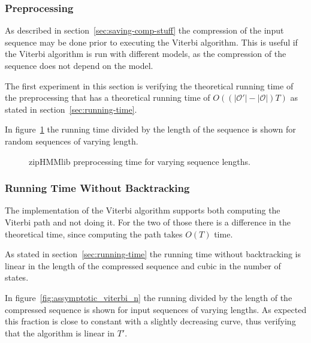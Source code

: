 \subsubsection{Preprocessing}
\label{sec:preprocessing}

As described in section~\ref{sec:saving-comp-stuff} the compression of the
input sequence may be done prior to executing the Viterbi algorithm. This is
useful if the Viterbi algorithm is run with different models, as the
compression of the sequence does not depend on the model.

The first experiment in this section is verifying the theoretical running time
of the preprocessing that has a theoretical running time of
$O( \left( \lvert\mathcal{O'}\rvert - \lvert{\mathcal{O}}\rvert \right) T)$ as
stated in section~\ref{sec:running-time}.

In figure~\ref{fig:pre_viterbi_n} the running time divided by the length of the
sequence is shown for random sequences of varying length. 

\begin{figure}
  \centering
  
  \caption{zipHMMlib preprocessing time for varying sequence lengths.}
  \label{fig:pre_viterbi_n}
\end{figure}

%   

\subsubsection{Running Time Without Backtracking}
\label{sec:running-time-without}

The implementation of the Viterbi algorithm supports both computing the Viterbi
path and not doing it. For the two of those there is a difference in the
theoretical time, since computing the path takes $O(T)$ time.

As stated in section~\ref{sec:running-time} the running time without
backtracking is linear in the length of the compressed sequence and cubic in
the number of states.

In figure~\ref{fig:assymptotic_viterbi_n} the running divided by the length of
the compressed sequence is shown for input sequences of varying lengths. As
expected this fraction is close to constant with a slightly decreasing curve,
thus verifying that the algorithm is linear in $T'$.

